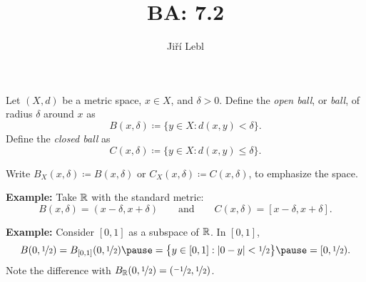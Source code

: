 \documentclass[10pt,aspectratio=149]{beamer}
\author{Ji\v{r}\'i Lebl}
\institute[OSU]{%
Departemento pri Matematiko de Oklahoma {\^S}tata Universitato}
\title{BA: 7.2}
\date{}
\begin{document}
\begin{frame}
\titlepage
\end{frame}

\begin{frame}
\begin{definition}
Let $(X,d)$ be a metric space, $x \in X$, and $\delta > 0$.
\pause
Define
the \emph{open ball}, or \emph{ball}, of radius $\delta$
around $x$ as
\begin{equation*}
B(x,\delta) \coloneqq \bigl\{ y \in X : d(x,y) < \delta \bigr\} .
\end{equation*}
\pause
Define the \emph{closed ball} as
\begin{equation*}
C(x,\delta) \coloneqq \bigl\{ y \in X : d(x,y) \leq \delta \bigr\} .
\end{equation*}
\end{definition}
\pause

Write $B_X(x,\delta) \coloneqq B(x,\delta)$ or $C_X(x,\delta) \coloneqq C(x,\delta)$,
to emphasize the space.

\pause
\medskip

\textbf{Example:}
Take ${\mathbb{R}}$ with the standard metric:
\[
B(x,\delta) = (x-\delta,x+\delta) \qquad \text{and} \qquad
C(x,\delta) = [x-\delta,x+\delta] .
\]

\pause
\medskip

\textbf{Example:}
Consider $[0,1]$ as a subspace of ${\mathbb{R}}$.
In $[0,1]$,
\[
B(0,\nicefrac{1}{2}) = B_{[0,1]}(0,\nicefrac{1}{2})
\pause
= \bigl\{ y \in [0,1] : \abs{0-y} < \nicefrac{1}{2} \bigr\}
\pause
= [0,\nicefrac{1}{2}) .
\]
\pause
Note the difference with $B_{{\mathbb{R}}}(0,\nicefrac{1}{2}) =
(\nicefrac{-1}{2},\nicefrac{1}{2})$.

\end{frame}
\end{document}
